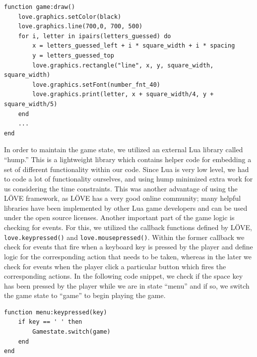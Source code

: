 \begin{lstlisting}[language={[5.2]Lua},caption=LuaLetterLizard \texttt{game:draw()} callback method, label=game]
function game:draw()
    love.graphics.setColor(black)
    love.graphics.line(700,0, 700, 500)
    for i, letter in ipairs(letters_guessed) do
        x = letters_guessed_left + i * square_width + i * spacing
        y = letters_guessed_top
        love.graphics.rectangle("line", x, y, square_width, square_width)
        love.graphics.setFont(number_fnt_40)
        love.graphics.print(letter, x + square_width/4, y + square_width/5)
    end
    ...
end
\end{lstlisting}

In order to maintain the game state, we utilized an external Lua library called ``hump.'' This is a lightweight library which contains helper code for embedding a set of different functionality within our code. Since Lua is very low level, we had to code a lot of functionality ourselves, and using hump minimized extra work for us considering the time constraints. This was another advantage of using the L\"OVE framework, as L\"OVE has a very good online community; many helpful libraries have been implemented by other Lua game developers and can be used under the open source licenses.
Another important part of the game logic is checking for events. For this, we utilized the callback functions defined by L\"OVE, \texttt{love.keypressed()} and \texttt{love.mousepressed()}. Within the former callback we check for events that fire when a keyboard key is pressed by the player and define logic for the corresponding action that needs to be taken, whereas in the later we check for events when the player click a particular button which fires the corresponding actions. In the following code snippet, we check if the space key has been pressed by the player while we are in state ``menu'' and if so, we switch the game state to ``game'' to begin playing the game.
	
\begin{lstlisting}[language={[5.2]Lua},caption=Handling the keypressed event in LuaLetterLizard,label=keypressed]
function menu:keypressed(key)
    if key == ' ' then
        Gamestate.switch(game)
    end
end
\end{lstlisting}
